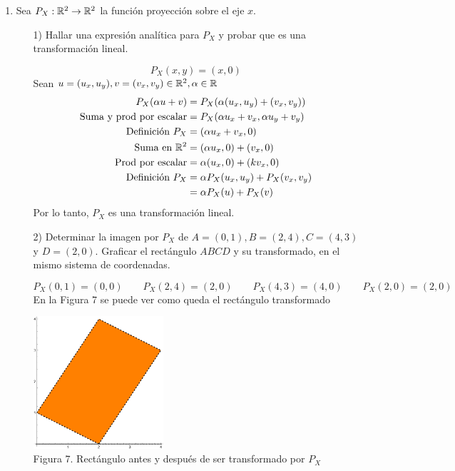 \begin{enumerate}
\begin{enumerate}
            \end{enumerate}
        \item Sea $P_X:\mathbb{R}^2\to\mathbb{R}^2$ la función proyección sobre el eje $x$.
            \begin{enumerate}
                \item[1)] Hallar una expresión analítica para $P_X$ y probar que es una transformación lineal.
                    \begin{mdframed}[style=s]
                        \[P_X(x,y)=(x,0)\]
                        Sean $u=(u_x,u_y),v=(v_x,v_y)\in\mathbb{R}^2,\alpha\in\mathbb{R}$
                        \begin{align*}
                            P_X(\alpha u+v)&=P_X(\alpha(u_x,u_y)+(v_x,v_y))\\
                            \text{Suma y prod por escalar}&=P_X(\alpha u_x+v_x,\alpha u_y+v_y)\\
                            \text{Definición }P_X&=(\alpha u_x+v_x,0)\\
                            \text{Suma en }\mathbb{R}^2&=(\alpha u_x,0)+(v_x,0)\\
                            \text{Prod por escalar}&=\alpha(u_x,0)+(kv_x,0)\\
                            \text{Definición }P_X&=\alpha P_X(u_x,u_y)+P_X(v_x,v_y)\\
                            &=\alpha P_X(u)+P_X(v)
                        \end{align*}
                        Por lo tanto, $P_X$ es una transformación lineal.
                    \end{mdframed}
                \item[2)] Determinar la imagen por $P_X$ de $A=(0,1),B=(2,4),C=(4,3)$ y $D=(2,0)$. Graficar el rectángulo $ABCD$ y su transformado, en el mismo sistema de coordenadas.
                    \begin{mdframed}[style=s]
                        \[P_X(0,1)=(0,0)\qquad P_X(2,4)=(2,0)\qquad P_X(4,3)=(4,0)\qquad P_X(2,0)=(2,0)\qquad \]
                        En la Figura 7 se puede ver como queda el rectángulo transformado
                        \begin{center}
                            \includegraphics[width=0.4\textwidth]{img/ej11d.png}\\
                            Figura 7. Rectángulo antes y después de ser transformado por $P_X$
                        \end{center}
                    \end{mdframed}
            \end{enumerate}
    \end{enumerate}